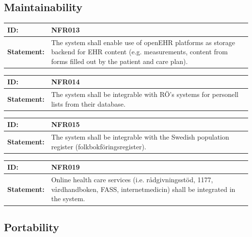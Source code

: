 \documentclass{scrreprt}
\begin{document}
\subsection{Maintainability}

\begin{center}
\begin{tabularx}{\linewidth}{| l | X |}
 \hline
 \textbf{ID:} & NFR013  \\ 
 \hline
 \textbf{Statement:} & The system shall enable use of openEHR platforms as storage backend for EHR content (e.g. measurements, content from forms filled out by the patient and care plan).
 \\ 
 \hline
\end{tabularx}
\end{center}

\begin{center}
\begin{tabularx}{\linewidth}{| l | X |}
 \hline
 \textbf{ID:} & NFR014  \\ 
 \hline
 \textbf{Statement:} & The system shall be integrable with RÖ’s systems for personell lists from their database.
 \\ 
 \hline
\end{tabularx}
\end{center}

\begin{center}
\begin{tabularx}{\linewidth}{| l | X |}
 \hline
 \textbf{ID:} & NFR015  \\ 
 \hline
 \textbf{Statement:} & The system shall be integrable with the Swedish population register (folkbokföringsregister). 
 \\ 
 \hline
\end{tabularx}
\end{center}

\begin{center}
\begin{tabularx}{\linewidth}{| l | X |}
 \hline
 \textbf{ID:} & NFR019  \\ 
 \hline
 \textbf{Statement:} & Online health care services (i.e. rådgivningsstöd, 1177, vårdhandboken, FASS, internetmedicin) shall be integrated in the system.
 \\ 
 \hline
\end{tabularx}
\end{center}

\subsection{Portability}
\end{document}
